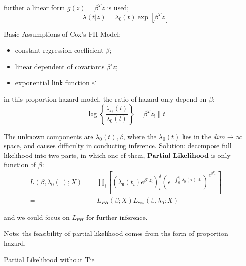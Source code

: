 further a linear form $ g(z)=\beta ^Tz $ is used;
\begin{equation}
     \lambda (t|z)=\lambda _0(t)\exp\left[ \beta ^Tz \right]
\end{equation}

Basic Assumptions of Cox's PH Model:
\begin{itemize}[topsep=2pt,itemsep=0pt]
    \item constant regression coefficient $ \beta  $;
    \item linear dependent of covariants $ \beta 'z $;
    \item exponential link function $ e^\cdot $
\end{itemize}

    

in this proportion hazard model, the ratio of hazard only depend on $ \beta  $:
\begin{equation}
    \log\left\{ \dfrac{\lambda _{z_i}(t)}{\lambda _0(t)} \right\}=\beta ^Tz_i\parallel t 
\end{equation}

The unknown components are $ \lambda _0(t),\beta  $, where the $ \lambda _0(t) $ lies in the $ dim\to\infty $ space, and causes difficulty in conducting inference. Solution: decompose full likelihood into two parts, in which one of them, \textbf{Partial Likelihood} is only function of $ \beta  $:
\begin{align}
    L(\beta ,\lambda _0(\cdot);X)=&\prod_{i}\left[ \left( \lambda _0(t_i)e^{\beta ^Tz_i} \right)^\delta _i\left( e^{-\int _{0}^{t_i}\lambda _0(\tau) \,\mathrm{d}\tau} \right)^{e^{\beta ^Tz_i}} \right]\\
    =&L_{PH}(\beta ;X)L_{res}(\beta ,\lambda _0;X)
\end{align}

and we could focus on $ L_{PH} $ for further inference.

Note: the feasibility of partial likelihood comes from the form of proportion hazard.

\begin{point}
    Partial Likelihood without Tie
\end{point}

